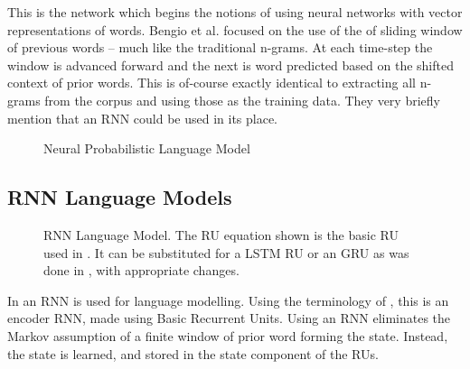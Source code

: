 \documentclass[parskip]{komatufte}
\begin{document}
This is the network which begins the notions of using neural networks with vector representations of words.
Bengio et al. focused on the use of the of sliding window of previous words -- much like the traditional n-grams.
At each time-step the window is advanced forward and the next is word predicted based on the shifted context of prior words.
This is of-course exactly identical to extracting all n-grams from the corpus and using those as the training data.
They very briefly mention that an RNN could be used in its place.

\begin{figure}
	\caption{Neural Probabilistic Language Model}
	\label{fig:neural-language-model}
	\centering
	 
\end{figure}


\subsection{RNN Language Models}
\begin{figure}
	\caption{RNN Language Model. The RU equation shown is the basic RU used in \textcite{mikolov2010recurrent}.
	It can be substituted for a LSTM RU or an GRU as was done in \textcite{sundermeyer2012lstm,jozefowicz2015empirical}, with appropriate changes.
	}
	\label{fig:neural-language-model}
	\centering
	\resizebox{\textwidth}{!}{}
\end{figure}


In  an RNN is used for language modelling.
Using the terminology of , this is an encoder RNN, made using Basic Recurrent Units.
Using an RNN eliminates the Markov assumption of a finite window of prior word forming the state.
Instead, the state is learned, and stored in the state component of the RUs. 
\end{document}
